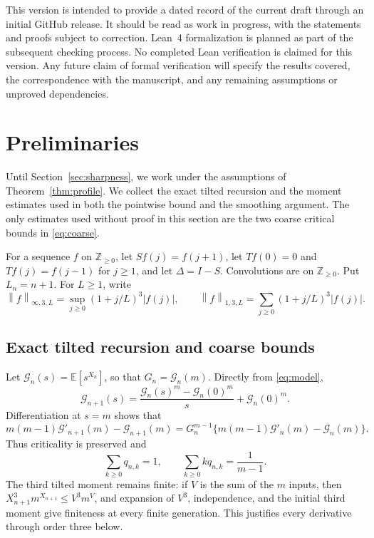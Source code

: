 \documentclass[11pt,letterpaper,reqno]{amsart}
\theoremstyle{plain}
\newcommand{\E}{\mathbb E}\newcommand{\Pp}{\mathbb P}
\newcommand{\Zp}{\mathbb Z_{\ge0}}
\newcommand{\norm}[1]{\left\lVert#1\right\rVert}
\begin{document}
This version is intended to provide a dated record of the current draft
through an initial GitHub release. It should be read as work in progress,
with the statements and proofs subject to correction. Lean~4 formalization
is planned as part of the subsequent checking process. No completed Lean
verification is claimed for this version. Any future claim of formal
verification will specify the results covered, the correspondence with
the manuscript, and any remaining assumptions or unproved dependencies.

\section{Preliminaries}\label{sec:prelim}
Until Section~\ref{sec:sharpness}, we work under the assumptions of Theorem~\ref{thm:profile}. We collect the exact tilted recursion and the moment estimates used in both the pointwise bound and the smoothing argument. The only estimates used without proof in this section are the two coarse critical bounds in \eqref{eq:coarse}.

For a sequence $f$ on $\Zp$, let $Sf(j)=f(j+1)$, let $Tf(0)=0$ and $Tf(j)=f(j-1)$ for $j\ge1$, and let $\Delta=I-S$. Convolutions are on $\Zp$. Put $L_n=n+1$. For $L\ge1$, write
\[
 \norm f_{\infty,3,L}=\sup_{j\ge0}(1+j/L)^3|f(j)|,
 \qquad \norm f_{1,3,L}=\sum_{j\ge0}(1+j/L)^3|f(j)|.
\]

\subsection{Exact tilted recursion and coarse bounds}
Let $\mathcal G_n(s)=\E[s^{X_n}]$, so that $G_n=\mathcal G_n(m)$. Directly from \eqref{eq:model},
\begin{equation}\label{eq:pgf}
 \mathcal G_{n+1}(s)=\frac{\mathcal G_n(s)^m-\mathcal G_n(0)^m}{s}+\mathcal G_n(0)^m.
\end{equation}
Differentiation at $s=m$ shows that
\[
 m(m-1)\mathcal G'_{n+1}(m)-\mathcal G_{n+1}(m)
 =G_n^{m-1}\{m(m-1)\mathcal G'_n(m)-\mathcal G_n(m)\}.
\]
Thus criticality is preserved and
\begin{equation}\label{eq:qmean}
 \sum_{k\ge0}q_{n,k}=1,\qquad \sum_{k\ge0}kq_{n,k}=\frac1{m-1}.
\end{equation}
The third tilted moment remains finite: if $V$ is the sum of the $m$ inputs, then $X_{n+1}^3m^{X_{n+1}}\le V^3m^V$, and expansion of $V^3$, independence, and the initial third moment give finiteness at every finite generation. This justifies every derivative through order three below.
\end{document}
